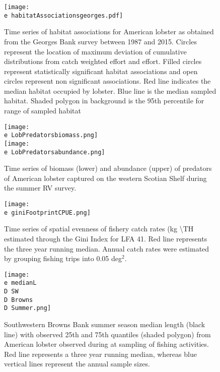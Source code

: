 \documentclass[11pt]{article}
\newcommand{\D}{.}
\newcommand{\e}{/backup/bio_data/bio.lobster/figures/} %
\begin{document}
\begin{figure}

    \texttt{[image: \\e habitatAssociationsgeorges.pdf]}
    \caption{Time series of habitat associations for American lobster as obtained from the Georges Bank survey between 1987 and 2015. Circles represent the location of maximum deviation of cumulative distributions from catch weighted effort and effort. Filled circles represent statistically significant habitat associations and open circles represent non significant associations. Red line indicates the median habitat occupied by lobster. Blue line is the median sampled habitat. Shaded polygon in background is the 95th percentile for range of sampled habitat}

\end{figure}





\begin{figure}
\centering
    \texttt{[image: \\e LobPredatorsbiomass.png]}\\
    \texttt{[image: \\e LobPredatorsabundance.png]}\\
    \caption{Time series of biomass (lower) and abundance (upper) of predators of American lobster captured on the western Scotian Shelf during the summer RV survey.}

\end{figure}




\begin{figure}

    \texttt{[image: \\e giniFootprintCPUE.png]}
    \caption{Time series of spatial evenness of fishery catch rates (kg \textbackslash TH estimated through the Gini Index for LFA 41. Red line represents the three year running median. Annual catch rates were estimated by grouping fishing trips into 0.05 deg$^2$.}

\end{figure}




\begin{figure}

    \texttt{[image: \\e medianL\\D SW\\D Browns\\D Summer.png]}
    \caption{Southwestern Browns Bank summer season median length (black line) with observed 25th and 75th quantiles (shaded polygon) from American lobster observed during at sampling of fishing activities. Red line represents a three year running median, whereas blue vertical lines represent the annual sample sizes.}

\end{figure}
\end{document}
